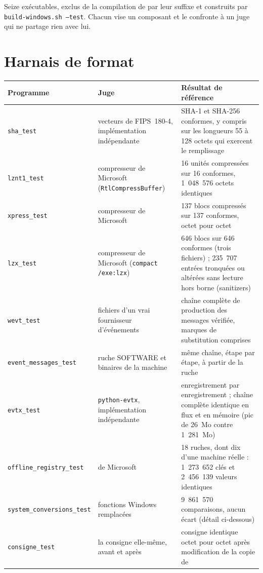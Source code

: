 \documentclass[11pt,a4paper,oneside]{report}
\begin{document}
Seize exécutables, exclus de la compilation de \wac{} par leur suffixe
 et construits par \texttt{build-windows.sh --test}.
Chacun vise un composant et le confronte à un juge qui ne partage rien avec
lui.

\section{Harnais de format}

\begin{longtable}{@{}L{4.6cm}L{3.8cm}L{6.6cm}@{}}
\toprule
\textbf{Programme} & \textbf{Juge} & \textbf{Résultat de référence} \\
\midrule
\endhead
\texttt{sha\_test} & vecteurs de FIPS~180-4, implémentation indépendante &
  SHA-1 et SHA-256 conformes, y compris sur les longueurs 55 à 128 octets qui
  exercent le remplissage \\
\texttt{lznt1\_test} & compresseur de Microsoft (\texttt{RtlCompressBuffer}) &
  16 unités compressées sur 16 conformes, 1~048~576 octets identiques \\
\texttt{xpress\_test} & compresseur de Microsoft &
  137 blocs compressés sur 137 conformes, octet pour octet \\
\texttt{lzx\_test} & compresseur de Microsoft (\texttt{compact /exe:lzx}) &
  646 blocs sur 646 conformes (trois fichiers) ; 235~707 entrées tronquées ou
  altérées sans lecture hors borne (sanitizers) \\
\texttt{wevt\_test} & fichiers d'un vrai fournisseur d'événements &
  chaîne complète de production des messages vérifiée, marques de substitution
  comprises \\
\texttt{event\_messages\_test} & ruche SOFTWARE et binaires de la machine &
  même chaîne, étape par étape, à partir de la ruche \\
\texttt{evtx\_test} & \texttt{python-evtx}, implémentation indépendante &
  enregistrement par enregistrement ; chaîne complète identique en flux et en
  mémoire (pic de 26~Mo contre 1~281~Mo) \\
\texttt{offline\_registry\_test} &  de Microsoft &
  18 ruches, dont dix d'une machine réelle : 1~273~652 clés et 2~456~139
  valeurs identiques \\
\texttt{system\_conversions\_test} & fonctions Windows remplacées &
  9~861~570 comparaisons, aucun écart (détail ci-dessous) \\
\texttt{consigne\_test} & la consigne elle-même, avant et après &
  consigne identique octet pour octet après modification de la copie de

\end{longtable}
\end{document}
